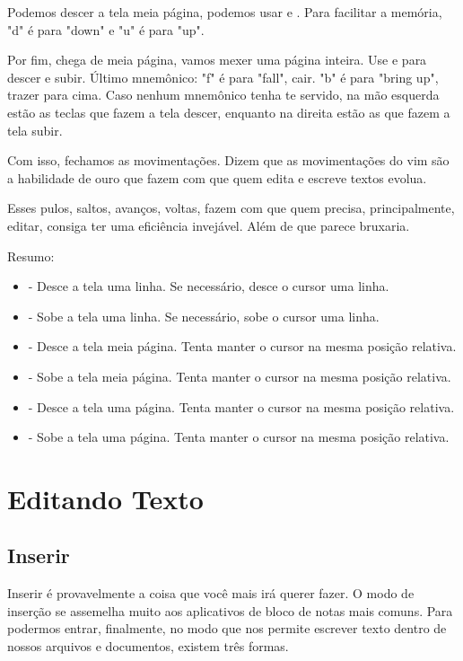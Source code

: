 Podemos descer a tela meia página, podemos usar  e .
Para facilitar a memória, "d" é para "down" e "u" é para "up".

Por fim, chega de meia página, vamos mexer uma página inteira.
Use  e  para descer e subir.
Último mnemônico: "f" é para "fall", cair.
"b" é para "bring up", trazer para cima.
Caso nenhum mnemônico tenha te servido,
na mão esquerda estão as teclas que fazem a tela descer,
enquanto na direita estão as que fazem a tela subir.

Com isso, fechamos as movimentações.
Dizem que as movimentações do vim são a habilidade de ouro que fazem com que quem edita e escreve textos evolua.

Esses pulos, saltos, avanços, voltas, fazem com que quem precisa, principalmente, editar, consiga ter uma eficiência invejável.
Além de que parece bruxaria.

Resumo:
\begin{itemize}
    \item {} - Desce a tela uma linha. Se necessário, desce o cursor uma linha.
    \item {} - Sobe a tela uma linha. Se necessário, sobe o cursor uma linha.
    \item {} - Desce a tela meia página. Tenta manter o cursor na mesma posição relativa.
    \item {} - Sobe a tela meia página. Tenta manter o cursor na mesma posição relativa.
    \item {} - Desce a tela uma página. Tenta manter o cursor na mesma posição relativa.
    \item {} - Sobe a tela uma página. Tenta manter o cursor na mesma posição relativa.
\end{itemize}

\section{Editando Texto}

\subsection{Inserir}
Inserir é provavelmente a coisa que você mais irá querer fazer.
O modo de inserção se assemelha muito aos aplicativos de bloco de notas mais comuns.
Para podermos entrar, finalmente, no modo que nos permite escrever texto dentro de nossos
arquivos e documentos, existem três formas.

